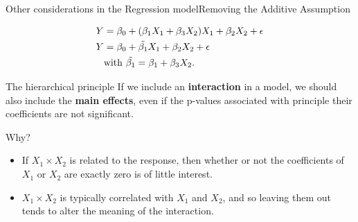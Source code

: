 \begin{frame}{Other considerations in the Regression model}{Removing the Additive Assumption}

    \begin{align*}
        Y &=   \beta_0 + (\beta_1 X_1 + \beta_3 X_2)X_1 + \beta_2 X_2 + \epsilon \\
        Y &=   \beta_0 + \Tilde{\beta_1}X_1 + \beta_2 X_2 + \epsilon \\
        & \text{with } \Tilde{\beta_1} = \beta_1 + \beta_3 X_2.
    \end{align*}
    

\begin{block}{The hierarchical principle}
        If we include an \textbf{interaction} in a model, we should also include the \textbf{main eﬀects}, even if the p-values associated with principle their coeﬃcients are not significant.
\end{block} \pause
Why? \pause
\begin{itemize}
    \item If $X_1 \times X_2$ is related to the response, then whether or not the coeﬃcients of $X_1$ or $X_2$ are exactly zero is of little interest. \pause
    \item $X_1 \times X_2$ is typically correlated with $X_1$ and $X_2$, and so leaving them out tends to alter the meaning of the interaction. \pause
\end{itemize}
    
\end{frame}


    

